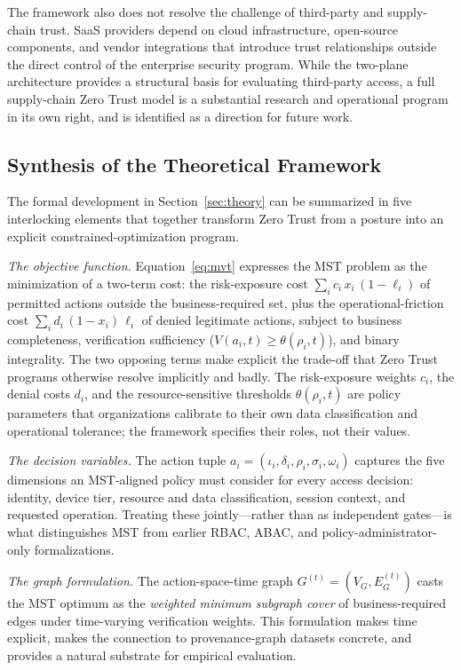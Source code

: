 \documentclass[acmlarge]{acmart}
\begin{document}
The framework also does not resolve the challenge of third-party and supply-chain trust.
SaaS providers depend on cloud infrastructure, open-source components, and vendor integrations
that introduce trust relationships outside the direct control of the enterprise security
program. While the two-plane architecture provides a structural basis for evaluating
third-party access, a full supply-chain Zero Trust model is a substantial research and
operational program in its own right, and is identified as a direction for future work.

\subsection{Synthesis of the Theoretical Framework}
\label{sec:outcomes_theory}

The formal development in Section~\ref{sec:theory} can be summarized in five
interlocking elements that together transform Zero Trust from a posture
into an explicit constrained-optimization program.

\textit{The objective function.} Equation~\ref{eq:mvt} expresses the MST
problem as the minimization of a two-term cost: the risk-exposure cost
$\sum_i c_i\, x_i\, (1-\ell_i)$ of permitted actions outside the
business-required set, plus the operational-friction cost
$\sum_i d_i\, (1-x_i)\, \ell_i$ of denied legitimate actions, subject to
business completeness, verification sufficiency
($V(a_i, t) \geq \theta(\rho_i, t)$), and binary integrality. The two
opposing terms make explicit the trade-off that Zero Trust programs
otherwise resolve implicitly and badly. The risk-exposure weights $c_i$,
the denial costs $d_i$, and the resource-sensitive thresholds
$\theta(\rho_i, t)$ are policy parameters that organizations calibrate to
their own data classification and operational tolerance; the framework
specifies their roles, not their values.

\textit{The decision variables.} The action tuple
$a_i = (\iota_i, \delta_i, \rho_i, \sigma_i, \omega_i)$ captures the
five dimensions an MST-aligned policy must consider for every access
decision: identity, device tier, resource and data classification,
session context, and requested operation. Treating these jointly---rather
than as independent gates---is what distinguishes MST from earlier
RBAC, ABAC, and policy-administrator-only formalizations.

\textit{The graph formulation.} The action-space-time graph
$G^{(t)} = (V_G, E_G^{(t)})$ casts the MST optimum as the
\textit{weighted minimum subgraph cover} of business-required edges
under time-varying verification weights. This formulation makes time
explicit, makes the connection to provenance-graph datasets concrete,
and provides a natural substrate for empirical evaluation.
\end{document}
